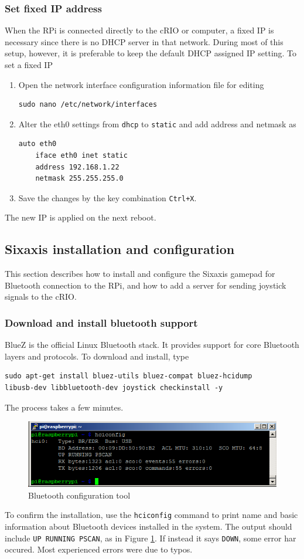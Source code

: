\documentclass[a4paper,english]{report}
\begin{document}
\subsubsection{Set fixed IP address}
When the RPi is connected directly to the cRIO or computer, a fixed IP is necessary since there is no DHCP server in that network. During most of this setup, however, it is preferable to keep the default DHCP assigned IP setting. To set a fixed IP
\begin{enumerate}
	\item Open the network interface configuration information file for editing\begin{verbatim}sudo nano /etc/network/interfaces\end{verbatim}
	\item Alter the eth0 settings from \texttt{dhcp} to \texttt{static} and
	add address and netmask as\begin{verbatim}auto eth0
	iface eth0 inet static
	address 192.168.1.22
	netmask 255.255.255.0\end{verbatim}
	\item Save the changes by the key combination \texttt{Ctrl+X}.
\end{enumerate}
The new IP is applied on the next reboot.

\subsection{Sixaxis installation and configuration}
This section describes how to install and configure the Sixaxis gamepad for Bluetooth connection to the RPi, and how to add a server for sending joystick signals to the cRIO.
\subsubsection{Download and install bluetooth support}
BlueZ is the official Linux Bluetooth stack. It provides support for core Bluetooth layers and protocols. To download and install, type
\begin{verbatim}sudo apt-get install bluez-utils bluez-compat bluez-hcidump
libusb-dev libbluetooth-dev joystick checkinstall -y\end{verbatim}
The process takes a few minutes.
\begin{figure}[htb!]
	\centering \includegraphics[scale=0.45]{fig/rpi_hciconfig} \caption{Bluetooth configuration tool}
	\label{fig: RPi hciconfig} 
\end{figure}
To confirm the installation, use the \texttt{hciconfig} command to print name and basic information about Bluetooth devices installed in the system. The output should include \texttt{UP RUNNING PSCAN}, as in Figure \ref{fig: RPi hciconfig}. If instead it says \texttt{DOWN}, some error har occured. Most experienced errors were due to typos.
\end{document}
